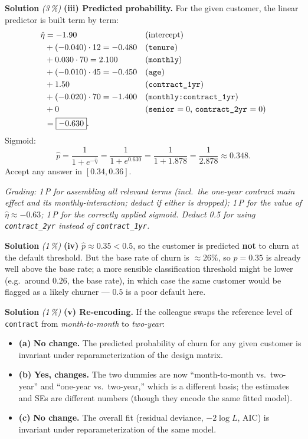 \documentclass[11pt,a4paper]{article}
\newcommand{\subpoints}[1]{\textit{(#1\,\%)}}
\newcommand{\sol}{\noindent\textbf{Solution}}
\begin{document}
\medskip
\sol{} \subpoints{3} \textbf{(iii) Predicted probability.} For the given customer, the linear
predictor is built term by term:
\begin{align*}
\hat\eta &= -1.90  &&\text{(intercept)} \\
& + (-0.040)\cdot 12 = -0.480 &&\text{(\texttt{tenure})}\\
& + 0.030\cdot 70 = 2.100 &&\text{(\texttt{monthly})}\\
& + (-0.010)\cdot 45 = -0.450 &&\text{(\texttt{age})}\\
& + 1.50 &&\text{(\texttt{contract\_1yr})}\\
& + (-0.020)\cdot 70 = -1.400 &&\text{(\texttt{monthly:contract\_1yr})}\\
& + 0 &&\text{(\texttt{senior} $=0$, \texttt{contract\_2yr} $=0$)}\\
&= \boxed{-0.630}.
\end{align*}
Sigmoid:
$$\hat p = \frac{1}{1+e^{-\hat\eta}} = \frac{1}{1+e^{0.630}} = \frac{1}{1+1.878} = \frac{1}{2.878} \approx \boxed{0.348}.$$
Accept any answer in $[0.34, 0.36]$.

\noindent\emph{Grading: 1\,P for assembling all relevant terms (incl.\ the one-year contract main
effect and its monthly-interaction; deduct if either is dropped); 1\,P for the value of
$\hat\eta\approx -0.63$; 1\,P for the correctly applied sigmoid. Deduct 0.5 for using
\texttt{contract\_2yr} instead of \texttt{contract\_1yr}.}

\medskip
\sol{} \subpoints{1} \textbf{(iv)} $\hat p \approx 0.35 < 0.5$, so the customer is predicted
\textbf{not} to churn at the default threshold. But the base rate of churn is $\approx 26\%$, so
$\hat p = 0.35$ is already well above the base rate; a more sensible classification threshold
might be lower (e.g.\ around $0.26$, the base rate), in which case the same customer would be
flagged as a likely churner --- $0.5$ is a poor default here.

\medskip
\sol{} \subpoints{1} \textbf{(v) Re-encoding.} If the colleague swaps the reference level of
\texttt{contract} from \emph{month-to-month} to \emph{two-year}:
\begin{itemize}
  \item \textbf{(a)} \textbf{No change.} The predicted probability of churn for any given customer
        is invariant under reparameterization of the design matrix.
  \item \textbf{(b)} \textbf{Yes, changes.} The two dummies are now ``month-to-month vs.\ two-year''
        and ``one-year vs.\ two-year,'' which is a different basis; the estimates and SEs are
        different numbers (though they encode the same fitted model).
  \item \textbf{(c)} \textbf{No change.} The overall fit (residual deviance, $-2\log L$, AIC) is
        invariant under reparameterization of the same model.
\end{itemize}
\end{document}
